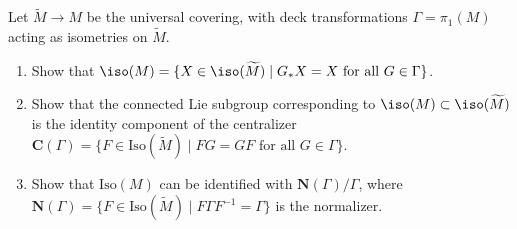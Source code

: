 \begin{remark}[Exercise 8.4.18]
  \label{rem:pet-ch8-ex-8-4-18}
  Let $\widetilde M\to M$ be the universal covering, with deck transformations
  $\Gamma=\pi_1(M)$ acting as isometries on $\widetilde M$.
  \begin{enumerate}
    \item Show that
      $\iso(M)=\{X\in\iso(\widetilde M)\mid G_*X=X\text{ for all }G\in\Gamma\}$.
    \item Show that the connected Lie subgroup corresponding to
      $\iso(M)\subset\iso(\widetilde M)$ is the identity component of the
      centralizer
      $\mathbf C(\Gamma)=\{F\in\mathrm{Iso}(\widetilde M)\mid FG=GF\text{ for all }G\in\Gamma\}$.
    \item Show that $\mathrm{Iso}(M)$ can be identified with
      $\mathbf N(\Gamma)/\Gamma$, where
      $\mathbf N(\Gamma)=\{F\in\mathrm{Iso}(\widetilde M)\mid F\Gamma F^{-1}=\Gamma\}$
      is the normalizer.
  \end{enumerate}
\end{remark}
